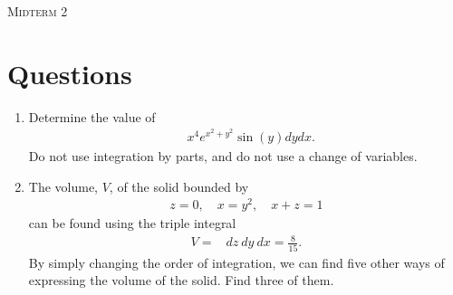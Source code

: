\documentclass{article}
\date{}
\begin{document}
\begin{center}
\textsc{\LARGE Midterm 2}\\[0.5cm]
\end{center}
\section*{Questions}

\begin{enumerate}
\item %
Determine the value of
\begin{align*}
  \mathop{\int_0^{\pi} \!\! \int_{-1}^1} x^4e^{x^2 + y^2}\sin(y) dydx.
\end{align*}
Do not use integration by parts, and do not use a change of variables. 


\item %
The volume, $V$, of the solid bounded by
\begin{align*}
  z=0, \quad x=y^2, \quad x+z=1
\end{align*}
can be found using the triple integral 
\begin{align*}
  V = \mathop{\int_{0}^{1} \!\! \int_{-\sqrt{x}}^{\sqrt{x}} \! \int_0^{1-x} } dz\ dy\ dx = \frac{8}{15}.
\end{align*}
By simply changing the order of integration, we can find five other ways of expressing the volume of the solid. Find three of them. 


\end{enumerate}
\end{document}
